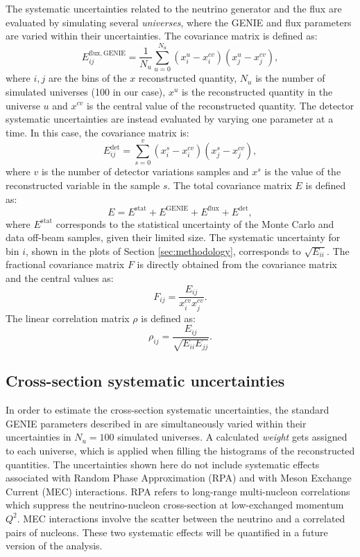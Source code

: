 The systematic uncertainties related to the neutrino generator and the flux are evaluated by simulating several \emph{universes}, where the GENIE and flux parameters are varied within their uncertainties. The covariance matrix is defined as:
\begin{equation}
    E_{ij}^{\mathrm{flux, GENIE}} = \frac{1}{N_{u}} \sum^{N_{u}}_{u=0} (x^{u}_{i} - x^{cv}_{i}) (x^{u}_{j} - x^{cv}_{j}),\label{eq:covariance}
\end{equation}
where $i,j$ are the bins of the $x$ reconstructed quantity, $N_{u}$ is the number of simulated universes (100 in our case), $x^{u}$ is the reconstructed quantity in the universe $u$ and $x^{cv}$ is the central value of the reconstructed quantity. 
The detector systematic uncertainties are instead evaluated by varying one parameter at a time. In this case, the covariance matrix is:
\begin{equation}
    E_{ij}^{\mathrm{det}} = \sum^{v}_{s=0} (x^{s}_{i} - x^{cv}_{i}) (x^{s}_{j} - x^{cv}_{j}),\label{eq:cov_det}
\end{equation}
where $v$ is the number of detector variations samples and $x^{s}$ is the value of the reconstructed variable in the sample $s$. The total covariance matrix $E$ is defined as:
\begin{equation}
    E = E^{\mathrm{stat}} + E^{\mathrm{GENIE}} + E^{\mathrm{flux}} + E^{\mathrm{det}},\label{eq:cov_tot}
\end{equation}
where $E^{\mathrm{stat}}$ corresponds to the statistical uncertainty of the Monte Carlo and data off-beam samples, given their limited size. 
The systematic uncertainty for bin $i$, shown in the plots of Section \ref{sec:methodology}, corresponds to $\sqrt{E_{ii}}$. The fractional covariance matrix $F$ is directly obtained from the covariance matrix and the central values as:
\begin{equation} 
    F_{ij} = \frac{E_{ij}}{x_{i}^{cv} x_{j}^{cv}}.
\end{equation}
The linear correlation matrix $\rho$ is defined as:
\begin{equation}
    \rho_{ij} = \frac{E_{ij}}{\sqrt{E_{ii}E_{jj}}}.
\end{equation}

\subsection{Cross-section systematic uncertainties}
In order to estimate the cross-section systematic uncertainties, the standard GENIE parameters described in \cite{Andreopoulos:2009rq} are simultaneously varied within their uncertainties in $N_{u} = 100$ simulated universes. A calculated \emph{weight} gets assigned to each universe, which is applied when filling the histograms of the reconstructed quantities. The uncertainties shown here do not include systematic effects associated with Random Phase Approximation (RPA) and with Meson Exchange Current (MEC) interactions. RPA refers to long-range multi-nucleon correlations which suppress the neutrino-nucleon cross-section at low-exchanged momentum $Q^2$. MEC interactions involve the scatter between the neutrino and a correlated pairs of nucleons. These two systematic effects will be quantified in a future version of the analysis.

